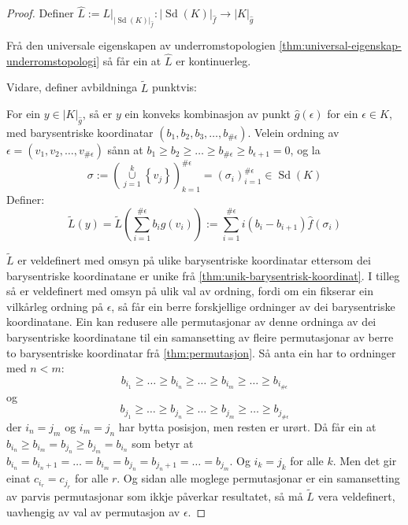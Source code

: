 \documentclass[a4paper, 12pt, norsk]{article}
\theoremstyle{plain}
\theoremstyle{definition}
\newcommand{\union}{ \mathop{\cup}\limits }
\newcommand{\gr}[1]{ \lvert #1 \rvert } %
\newcommand{\set}[1]{ \left\{ #1 \right\} } %
\newcommand{\tuple}[1]{ \left( #1 \right) } %
\DeclareMathOperator{\Sd}{Sd} %
\begin{document}
\begin{proof}
	Definer \( \hat{L} := L|_{\gr{\Sd(K)}_{\hat{f}}}: \gr{\Sd(K)}_{\hat{f}} \to \gr{K}_{\hat{g}} \)

	Frå den universale eigenskapen av underromstopologien \autoref{thm:universal-eigenskap-underromstopologi} så får ein at \( \hat{L} \) er kontinuerleg.

	Vidare, definer avbildninga \( \tilde{L} \) punktvis:
	
	For ein \( y \in \gr{K}_{\hat{g}} \), så er \( y \) ein konveks kombinasjon av punkt \( \hat{g}(\epsilon) \) for ein \( \epsilon \in K \), med barysentriske koordinatar \( \tuple{b_1, b_2, b_3, \dots, b_{\#\epsilon}} \). Velein ordning av \( \epsilon = \tuple{v_1, v_2, \dots, v_{\#\epsilon}} \) sånn at \( b_1 \geq b_2 \geq \dots \geq b_{\#\epsilon} \geq  b_{\epsilon+1}=0 \), og la
	\[
		\sigma := \tuple{\union_{j=1}^k\set{v_j}}_{k=1}^{\#\epsilon} = \tuple{\sigma_i}_{i=1}^{\#\epsilon} \in \Sd(K)
	\]
	Definer:
	\[
		\tilde{L}(y) = \tilde{L}\tuple{\sum_{i=1}^{\#\epsilon} b_i \hat{g}(v_i)} := \sum_{i=1}^{\#\epsilon}i\tuple{b_i-b_{i+1}}\hat{f}(\sigma_i)
	\]

	\( \tilde{L} \) er veldefinert med omsyn på ulike barysentriske koordinatar ettersom dei barysentriske koordinatane er unike frå \autoref{thm:unik-barysentrisk-koordinat}. I tilleg så er veldefinert med omsyn på ulik val av ordning, fordi om ein fikserar ein vilkårleg ordning på \( \epsilon \), så får ein berre forskjellige ordninger av dei barysentriske koordinatane. Ein kan redusere alle permutasjonar av denne ordninga av dei barysentriske koordinatane til ein samansetting av fleire permutasjonar av berre to barysentriske koordinatar frå \autoref{thm:permutasjon}. Så anta ein har to ordninger med \( n < m \):
	\[
		b_{i_1} \geq \dots \geq b_{i_n} \geq \dots \geq b_{i_m} \geq \dots \geq b_{i_{\#\epsilon}}
	\]
	og
	\[
		b_{j_1} \geq \dots \geq b_{j_n} \geq \dots \geq b_{j_m} \geq \dots \geq b_{j_{\#\epsilon}}
	\]
	der \( i_n=j_m \) og \( i_m=j_n \) har bytta posisjon, men resten er urørt. Då får ein at \( b_{i_n} \geq b_{i_m}=b_{j_n} \geq b_{j_m}=b_{i_n} \) som betyr at \( b_{i_n} = b_{i_n+1} = \dots = b_{i_m}=b_{j_n}=b_{j_n+1}=\dots=b_{j_m} \). Og \( i_k = j_k \) for alle \( k \). Men det gir einat \( c_{i_r} = c_{j_r} \) for alle \( r \). Og sidan alle moglege permutasjonar er ein samansetting av parvis permutasjonar som ikkje påverkar resultatet, så må \( \tilde{L} \) vera veldefinert, uavhengig av val av permutasjon av \( \epsilon \).


\end{proof}
\end{document}
